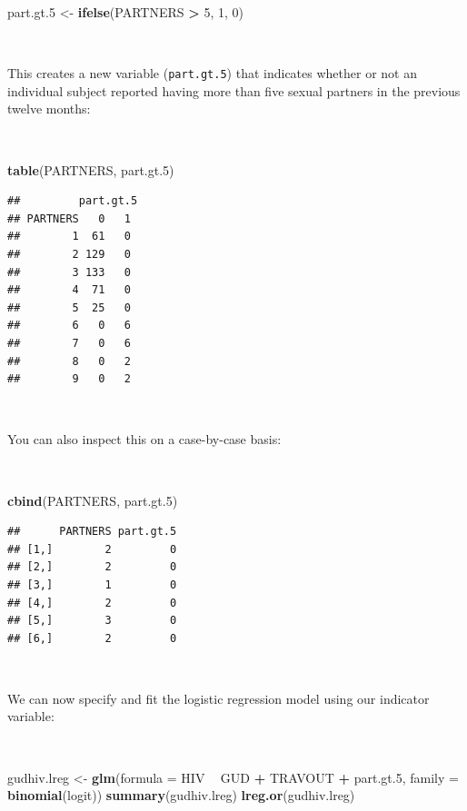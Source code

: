 \documentclass[12pt,a4paper]{book}
\newenvironment{Shaded}{\begin{snugshade}}{\end{snugshade}}
\newcommand{\DataTypeTok}[1]{\textcolor[rgb]{0.13,0.29,0.53}{#1}}
\newcommand{\DecValTok}[1]{\textcolor[rgb]{0.00,0.00,0.81}{#1}}
\newcommand{\FloatTok}[1]{\textcolor[rgb]{0.00,0.00,0.81}{#1}}
\newcommand{\KeywordTok}[1]{\textcolor[rgb]{0.13,0.29,0.53}{\textbf{#1}}}
\newcommand{\NormalTok}[1]{#1}
\newcommand{\OperatorTok}[1]{\textcolor[rgb]{0.81,0.36,0.00}{\textbf{#1}}}
\newcommand{\StringTok}[1]{\textcolor[rgb]{0.31,0.60,0.02}{#1}}
\theoremstyle{definition}
\theoremstyle{definition}
\theoremstyle{definition}
\theoremstyle{remark}
\begin{document}
\begin{Shaded}
\begin{Highlighting}[]
\NormalTok{part.gt}\FloatTok{.5}\NormalTok{ <-}\StringTok{ }\KeywordTok{ifelse}\NormalTok{(PARTNERS }\OperatorTok{>}\StringTok{ }\DecValTok{5}\NormalTok{, }\DecValTok{1}\NormalTok{, }\DecValTok{0}\NormalTok{)}
\end{Highlighting}
\end{Shaded}

~

This creates a new variable (\texttt{part.gt.5}) that indicates whether
or not an individual subject reported having more than five sexual
partners in the previous twelve months:

~

\begin{Shaded}
\begin{Highlighting}[]
\KeywordTok{table}\NormalTok{(PARTNERS, part.gt}\FloatTok{.5}\NormalTok{)}
\end{Highlighting}
\end{Shaded}

\begin{verbatim}
##         part.gt.5
## PARTNERS   0   1
##        1  61   0
##        2 129   0
##        3 133   0
##        4  71   0
##        5  25   0
##        6   0   6
##        7   0   6
##        8   0   2
##        9   0   2
\end{verbatim}

~

You can also inspect this on a case-by-case basis:

~

\begin{Shaded}
\begin{Highlighting}[]
\KeywordTok{cbind}\NormalTok{(PARTNERS, part.gt}\FloatTok{.5}\NormalTok{)}
\end{Highlighting}
\end{Shaded}

\begin{verbatim}
##      PARTNERS part.gt.5
## [1,]        2         0
## [2,]        2         0
## [3,]        1         0
## [4,]        2         0
## [5,]        3         0
## [6,]        2         0
\end{verbatim}

~

We can now specify and fit the logistic regression model using our
indicator variable:

~

\begin{Shaded}
\begin{Highlighting}[]
\NormalTok{gudhiv.lreg <-}\StringTok{ }\KeywordTok{glm}\NormalTok{(}\DataTypeTok{formula =}\NormalTok{ HIV }\OperatorTok{~}\StringTok{ }\NormalTok{GUD }\OperatorTok{+}\StringTok{ }\NormalTok{TRAVOUT }\OperatorTok{+}\StringTok{ }\NormalTok{part.gt}\FloatTok{.5}\NormalTok{,}
                   \DataTypeTok{family =} \KeywordTok{binomial}\NormalTok{(logit))}
\KeywordTok{summary}\NormalTok{(gudhiv.lreg)}
\KeywordTok{lreg.or}\NormalTok{(gudhiv.lreg)}
\end{Highlighting}
\end{Shaded}
\end{document}
